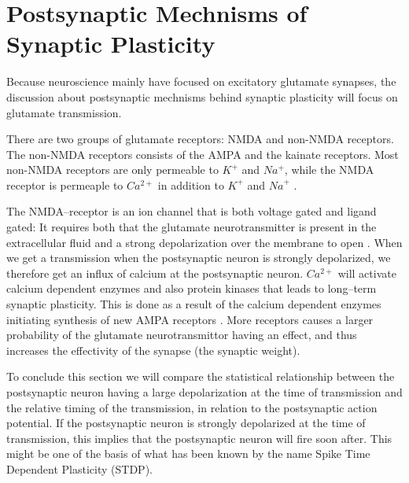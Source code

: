\section{Postsynaptic Mechnisms of Synaptic Plasticity}
\label{appendixSynapticPlasticity:postsynapticMechanisms}
Because neuroscience mainly have focused on excitatory glutamate synapses, the discussion about postsynaptic mechnisms behind synaptic plasticity will focus on glutamate transmission.

There are two groups of glutamate receptors: NMDA and non-NMDA receptors. 
The non-NMDA receptors consists of the AMPA and the kainate receptors. 
Most non-NMDA receptors are only permeable to $K^+$ and $Na^+$, while the NMDA receptor is permeaple to $Ca^{2+}$ in addition to $K^+$ and ${Na}^+$ \cite{PrinciplesOfNeuralScience4edKAP12}. 


The NMDA--receptor is an ion channel that is both voltage gated and ligand gated: 
	It requires both that the glutamate neurotransmitter is present in the extracellular fluid and a strong depolarization over the membrane to open \cite{PrinciplesOfNeuralScience4edKAP12}. 
When we get a transmission when the postsynaptic neuron is strongly depolarized, we therefore get an influx of calcium at the postsynaptic neuron.
$Ca^{2+}$ will activate calcium dependent enzymes and also protein kinases that leads to long--term synaptic plasticity\cite{PrinciplesOfNeuralScience4edKAP12}.
This is done as a result of the calcium dependent enzymes initiating synthesis of new AMPA receptors \cite{AMPARtrafficingArtikkel}. 
More receptors causes a larger probability of the glutamate neurotransmittor having an effect, and thus increases the effectivity of the synapse (the synaptic weight).

To conclude this section we will compare the statistical relationship between the postsynaptic neuron having a large depolarization at the time of transmission and the relative timing of the transmission, 
	in relation to the postsynaptic action potential. 
If the postsynaptic neuron is strongly depolarized at the time of transmission, this implies that the postsynaptic neuron will fire soon after.
This might be one of the basis of what has been known by the name Spike Time Dependent Plasticity (STDP).

